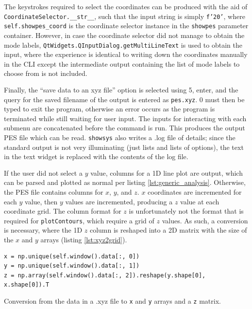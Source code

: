\documentclass[12pt]{article}
\newenvironment{code}{\captionsetup{type=listing}}{\par\addvspace{\baselineskip}}
\begin{document}
The keystrokes required to select the coordinates can be produced with the aid of \texttt{CoordinateSelector.\_\_str\_\_}, such that the input string is simply \texttt{f'20\n'}, where \texttt{self.showpes_coord} is the coordinate selector instance in the \texttt{showpes} parameter container. However, in case the coordinate selector did not manage to obtain the mode labels, \texttt{QtWidgets.QInputDialog.getMultiLineText} is used to obtain the input, where the experience is identical to writing down the coordinates manually in the CLI except the intermediate output containing the list of mode labels to choose from is not included.

Finally, the ``save data to an xyz file'' option is selected using 5, enter, and the query for the saved filename of the output is entered as \texttt{pes.xyz}. 0 must then be typed to exit the program, otherwise an error occurs as the program is terminated while still waiting for user input. The inputs for interacting with each submenu are concatenated before the command is run. This produces the output PES file which can be read. \texttt{showsys} also writes a .log file of details; since the standard output is not very illuminating (just lists and lists of options), the text in the text widget is replaced with the contents of the log file.

If the user did not select a \(y\) value, columns for a 1D line plot are output, which can be parsed and plotted as normal per listing \ref{lst:generic_analysis}. Otherwise, the PES file contains columns for \(x\), \(y\), and \(z\). \(x\) coordinates are incremented for each \(y\) value, then \(y\) values are incremented, producing a \(z\) value at each coordinate grid. The column format for \(z\) is unfortunately not the format that is required for \texttt{plotContours}, which require a grid of \(z\) values. As such, a conversion is necessary, where the 1D \(z\) column is reshaped into a 2D matrix with the size of the \(x\) and \(y\) arrays (listing \ref{lst:xyz2grid}).

\begin{code}\begin{verbatim}
x = np.unique(self.window().data[:, 0])
y = np.unique(self.window().data[:, 1])
z = np.array(self.window().data[:, 2]).reshape(y.shape[0], x.shape[0]).T
\end{verbatim}
\caption{Conversion from the data in a .xyz file to \texttt{x} and \texttt{y} arrays and a \texttt{z} matrix.}
\label{lst:xyz2grid}
\end{code}
\end{document}

